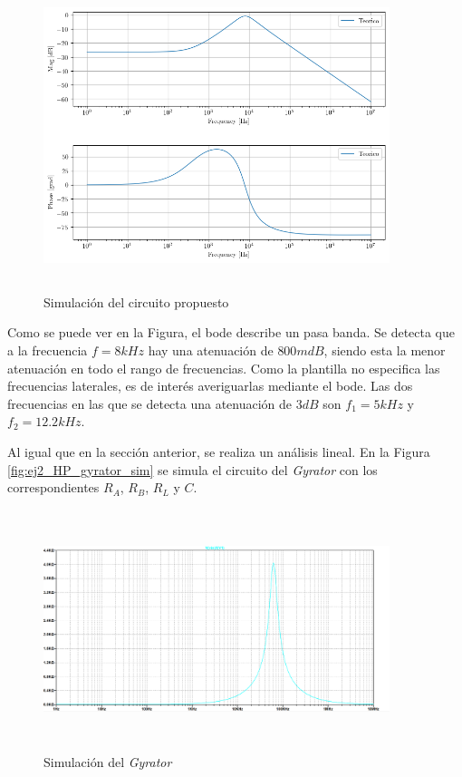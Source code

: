 \documentclass[12pt,a4paper]{article}
\begin{document}
\begin{figure}[h!]                                                       
    \centering\includegraphics[width=0.9\textwidth, height=9cm]{Resources/ej2_bp_sim.png}
    \caption{Simulación del circuito propuesto }
    \label{ej2_bp_sim}
    \end{figure}

Como se puede ver en la Figura, el bode describe un pasa banda. Se detecta que a la frecuencia $f = 8kHz$ hay una atenuación de $800 mdB$, siendo esta la menor atenuación en todo el rango de frecuencias. Como la plantilla no especifica las frecuencias laterales, es de interés averiguarlas mediante el bode. Las dos frecuencias en las que se detecta una atenuación de $3 dB$ son $f_1 = 5kHz$ y $f_2 = 12.2kHz$. 


Al igual que en la sección anterior, se realiza un análisis lineal. En la Figura \ref{fig:ej2_HP_gyrator_sim} se simula el circuito del \textit{Gyrator} con los correspondientes  $R_A$, $R_B$,  $R_L$ y $C$.



\begin{figure}[h!]                                                       
    \centering\includegraphics[width=0.9\textwidth, height=7cm]{Resources/ej2_bp_gyrator_sim.png}
    \caption{Simulación del \textit{Gyrator} }
    \label{fig:ej2_BP_gyrator_sim}
    \end{figure}
\end{document}
